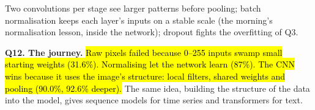 \documentclass[10pt,a4paper]{article}
\newcommand{\q}[1]{\textbf{\color{blue!50!black}#1}}
\begin{document}
\vspace{2pt}
Two convolutions per stage see larger patterns before pooling; batch normalisation keeps each layer's inputs on a
stable scale (the morning's normalisation lesson, inside the network); dropout fights the overfitting of Q3.

\q{Q12. The journey.} \hl{Raw pixels failed because 0--255 inputs swamp small starting weights (31.6\%). Normalising
let the network learn (87\%). The CNN wins because it uses the image's structure: local filters, shared weights and
pooling (90.0\%, 92.6\% deeper).} The same idea, building the structure of the data into the model, gives sequence
models for time series and transformers for text.
\end{document}
